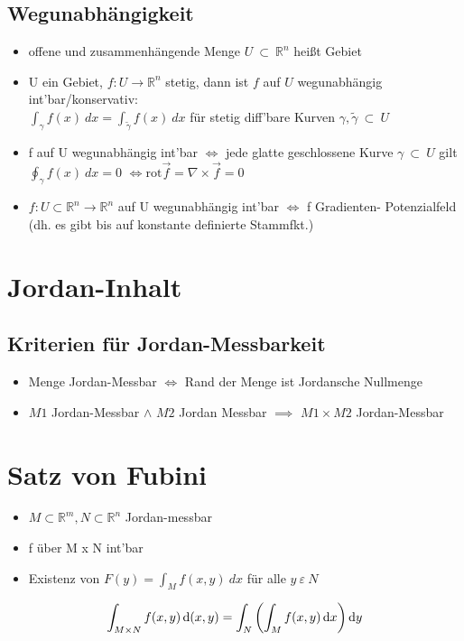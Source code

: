 \subsection{Wegunabhängigkeit}
\begin{itemize}
    \item offene und zusammenhängende Menge $U \ \subset \ \mathbb{R}^n$ heißt Gebiet
    \item U ein Gebiet, $f: U\rightarrow \mathbb{R}^n$ stetig, dann ist $f$ auf $U$             wegunabhängig int'bar/konservativ:\\
          $\int_\gamma f(x) \ dx = \int_{\widetilde{\gamma}} f(x) \ dx$ für stetig diff'bare Kurven $\gamma,\widetilde{\gamma} \ \subset \ U$
    \item f auf U wegunabhängig int'bar $\iff$ jede glatte geschlossene Kurve $\gamma       \ \subset \ U$ gilt $\oint_\gamma f(x) \ dx = 0$ $\iff \text{rot} \vec{f}=\nabla \times \vec{f}=0$
    \item $f: U \subset \mathbb{R}^n \rightarrow \mathbb{R}^n$ auf U wegunabhängig         int'bar $\iff$ f Gradienten- Potenzialfeld (dh. es gibt bis auf konstante        definierte Stammfkt.)
\end{itemize}

\section{Jordan-Inhalt}
\subsection{Kriterien für Jordan-Messbarkeit}
\begin{itemize}
    \item Menge Jordan-Messbar $\iff$ Rand der Menge ist Jordansche Nullmenge
    \item $M1$ Jordan-Messbar $\wedge$ $M2$ Jordan Messbar $\implies$ $M1 \times M2$ Jordan-Messbar
\end{itemize}


\section{Satz von Fubini}
\begin{itemize}
    \item $M \subset \mathbb{R}^m, N\subset \mathbb{R}^n$ Jordan-messbar
    \item f über M x N int'bar
    \item Existenz von $F(y) = \int_M f(x,y) \ dx$ für alle $ y  \ \varepsilon \ N $
\end{itemize}
\begin{equation}
    \int_{M\times N} f(x,y)\mathop{}\!\mathrm{d} (x,y) = \int_N \left ( \int_M f(x,y) \mathop{}\!\mathrm{d} x \right)\mathop{}\!\mathrm{d} y
\end{equation}

